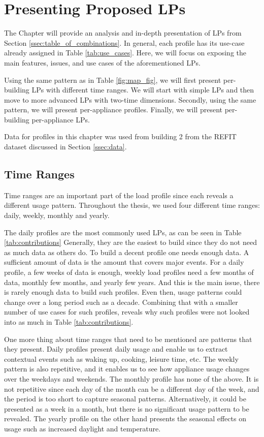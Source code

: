 \chapter{Presenting Proposed LPs}
\label{chapter4}

The Chapter will provide an analysis and in-depth presentation of LPs from Section \ref{ssec:table_of_combinations}.
In general, each profile has its use-case already assigned in Table \ref{tab:use_cases}.
Here, we will focus on exposing the main features, issues, and use cases of the aforementioned LPs. 

Using the same pattern as in Table \ref{fig:map_fig}, we will first present per-building LPs with different time ranges.
We will start with simple LPs and then move to more advanced LPs with two-time dimensions.
Secondly, using the same pattern, we will present per-appliance profiles.
Finally, we will present per-building per-appliance LPs.

Data for profiles in this chapter was used from building 2 from the REFIT dataset discussed in Section \ref{ssec:data}.

\section{Time Ranges}
\label{sec:time_range}

Time ranges are an important part of the load profile since each reveals a different usage pattern.
Throughout the thesis, we used four different time ranges: daily, weekly, monthly and yearly.

The daily profiles are the most commonly used LPs, as can be seen in Table \ref{tab:contributions}
Generally, they are the easiest to build since they do not need as much data as others do.
To build a decent profile one needs enough data. 
A sufficient amount of data is the amount that covers major events.
For a daily profile, a few weeks of data is enough, weekly load profiles need a few months of data, monthly few months, and yearly few years.
And this is the main issue, there is rarely enough data to build such profiles.
Even then, usage patterns could change over a long period such as a decade.
Combining that with a smaller number of use cases for such profiles, reveals why such profiles were not looked into as much in Table \ref{tab:contributions}.

One more thing about time ranges that need to be mentioned are patterns that they present.
Daily profiles present daily usage and enable us to extract contextual events such as waking up, cooking, leisure time, etc.
The weekly pattern is also repetitive, and it enables us to see how appliance usage changes over the weekdays and weekends.
The monthly profile has none of the above. It is not repetitive since each day of the month can be a different day of the week, and the period is too short to capture seasonal patterns.
Alternatively, it could be presented as a week in a month, but there is no significant usage pattern to be revealed.
The yearly profile on the other hand presents the seasonal effects on usage such as increased daylight and temperature. 

